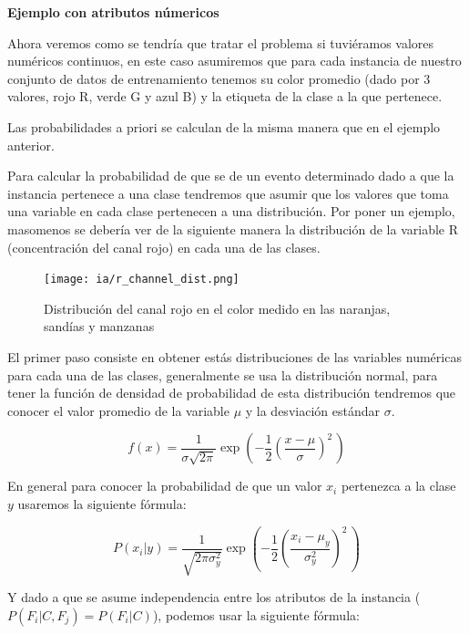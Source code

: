 \documentclass[11pt,fleqn]{book} %
\begin{document}
\textbf{Ejemplo con atributos númericos}

Ahora veremos como se tendría que tratar el problema si tuviéramos valores numéricos continuos, en este caso asumiremos que para cada instancia de nuestro conjunto de datos de entrenamiento tenemos su color promedio (dado por 3 valores, rojo R, verde G y azul B) y la etiqueta de la clase a la que pertenece.

Las probabilidades a priori se calculan de la misma manera que en el ejemplo anterior.

Para calcular la probabilidad de que se de un evento determinado dado a que la instancia pertenece a una clase tendremos que asumir que los valores que toma una variable en cada clase pertenecen a una distribución. Por poner un ejemplo, masomenos se debería ver de la siguiente manera la distribución de la variable R (concentración del canal rojo) en cada una de las clases.

\begin{figure}[ht]
\centering\texttt{[image: ia/r\_channel\_dist.png]}
\caption{Distribución del canal rojo en el color medido en las naranjas, sandías y manzanas}

\label{fig:distributionchannelr} 
\end{figure}

El primer paso consiste en obtener estás distribuciones de las variables numéricas para cada una de las clases, generalmente se usa la distribución normal, para tener la función de densidad de probabilidad de esta distribución tendremos que conocer el valor promedio de la variable $\mu$ y la desviación estándar $\sigma$.

\begin{equation}
 f(x) = \frac{1}{\sigma\sqrt{2\pi}} 
  \exp\left( -\frac{1}{2}\left(\frac{x-\mu}{\sigma}\right)^{\!2}\,\right)
\end{equation}

En general para conocer la probabilidad de que un valor $x_i$ pertenezca a la clase $y$ usaremos la siguiente fórmula:

\begin{equation}
 P(x_i | y) = \frac{1}{ \sqrt{ 2 \pi \sigma_{y}^{2} } } 
  \exp\left( -\frac{1}{2}\left(\frac{x_i -\mu_{y}}{\sigma_{y}^{2}}\right)^{\!2}\,\right)
\end{equation}

Y dado a que se asume independencia entre los atributos de la instancia ($P(F_{i}\vert C,F_{j})=P(F_{i}\vert C)$), podemos usar la siguiente fórmula:
\end{document}
